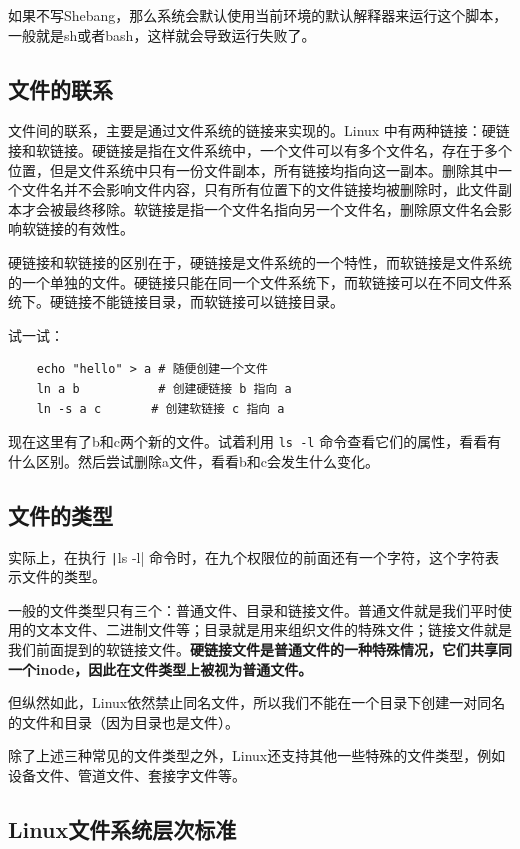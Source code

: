 如果不写Shebang，那么系统会默认使用当前环境的默认解释器来运行这个脚本，一般就是sh或者bash，这样就会导致运行失败了。

\subsection{文件的联系}

文件间的联系，主要是通过文件系统的链接来实现的。Linux 中有两种链接：硬链接和软链接。硬链接是指在文件系统中，一个文件可以有多个文件名，存在于多个位置，但是文件系统中只有一份文件副本，所有链接均指向这一副本。删除其中一个文件名并不会影响文件内容，只有所有位置下的文件链接均被删除时，此文件副本才会被最终移除。软链接是指一个文件名指向另一个文件名，删除原文件名会影响软链接的有效性。

硬链接和软链接的区别在于，硬链接是文件系统的一个特性，而软链接是文件系统的一个单独的文件。硬链接只能在同一个文件系统下，而软链接可以在不同文件系统下。硬链接不能链接目录，而软链接可以链接目录。

\begin{tip}
  试一试：
  \begin{verbatim}
    echo "hello" > a # 随便创建一个文件
    ln a b           # 创建硬链接 b 指向 a
    ln -s a c       # 创建软链接 c 指向 a
  \end{verbatim}
  现在这里有了b和c两个新的文件。试着利用 \texttt{ls -l} 命令查看它们的属性，看看有什么区别。然后尝试删除a文件，看看b和c会发生什么变化。
\end{tip}

\subsection{文件的类型}

实际上，在执行 \texttt|ls -l| 命令时，在九个权限位的前面还有一个字符，这个字符表示文件的类型。

一般的文件类型只有三个：普通文件、目录和链接文件。普通文件就是我们平时使用的文本文件、二进制文件等；目录就是用来组织文件的特殊文件；链接文件就是我们前面提到的软链接文件。\textbf{硬链接文件是普通文件的一种特殊情况，它们共享同一个inode，因此在文件类型上被视为普通文件。}

但纵然如此，Linux依然禁止同名文件，所以我们不能在一个目录下创建一对同名的文件和目录（因为目录也是文件）。

除了上述三种常见的文件类型之外，Linux还支持其他一些特殊的文件类型，例如设备文件、管道文件、套接字文件等。

\subsection{Linux文件系统层次标准}

